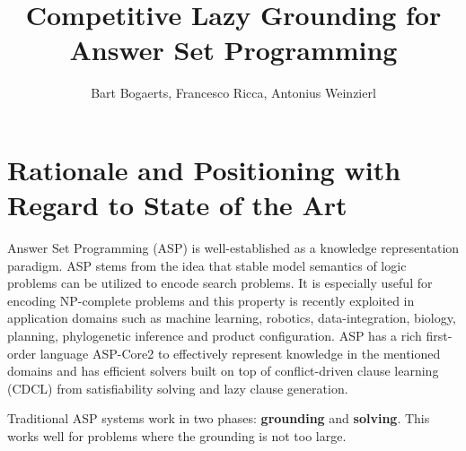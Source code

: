 \documentclass[a4paper,11pt]{article}
\title{Competitive Lazy Grounding for Answer Set Programming}
\author{Bart Bogaerts, Francesco Ricca, Antonius Weinzierl}
\begin{document}
\setdefaultleftmargin{1em}{0.8em}{0.5em}{1.7em}{1em}{1em}  





% 

\section{Rationale and Positioning with Regard to State of the Art}
Answer Set Programming (ASP) is well-established as a knowledge representation paradigm. ASP stems from the idea that stable model semantics of logic problems can be utilized to encode search problems. It is especially useful for encoding NP-complete problems and this property is recently exploited in application domains such as machine learning, robotics, data-integration, biology, planning, phylogenetic inference and product configuration. ASP has a rich first-order language ASP-Core2 to effectively represent knowledge in the mentioned domains and has efficient solvers built on top of conflict-driven clause learning (CDCL) from satisfiability solving and lazy clause generation.

\begin{framefloat}[h]
Traditional ASP systems work in two phases: \textbf{grounding} and \textbf{solving}. This works well for problems where the grounding is not too large.
\end{framefloat}
\end{document}
